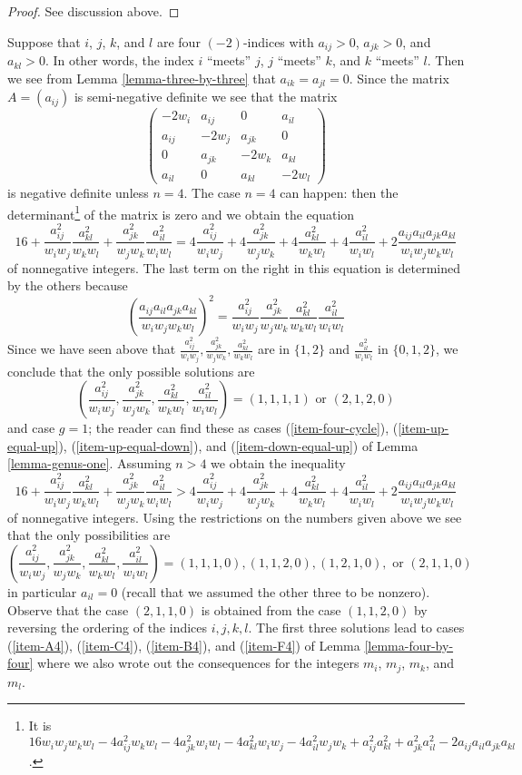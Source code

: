 \begin{proof}
See discussion above.
\end{proof}

\noindent
Suppose that $i$, $j$, $k$, and $l$ are four $(-2)$-indices with
$a_{ij} > 0$, $a_{jk} > 0$, and $a_{kl} > 0$. In other words, the
index $i$ ``meets'' $j$, $j$ ``meets'' $k$, and $k$ ``meets'' $l$.
Then we see from Lemma \ref{lemma-three-by-three} that $a_{ik} = a_{jl} = 0$.
Since the matrix $A = (a_{ij})$ is semi-negative definite we see that the
matrix
$$
\left(
\begin{matrix}
-2w_i & a_{ij} & 0 & a_{il} \\
a_{ij} & -2w_j & a_{jk} & 0 \\
0 & a_{jk} & -2w_k & a_{kl} \\
a_{il} & 0 & a_{kl} & -2w_l
\end{matrix}
\right)
$$
is negative definite unless $n = 4$. The case $n = 4$ can happen:
then the determinant\footnote{It is
$16w_iw_jw_kw_l - 4a_{ij}^2w_kw_l - 4a_{jk}^2w_iw_l - 4a_{kl}^2w_iw_j -
4a_{il}^2w_jw_k + a_{ij}^2a_{kl}^2 + a_{jk}^2a_{il}^2 -
2a_{ij}a_{il}a_{jk}a_{kl}$.} of the matrix is zero and we obtain the equation
$$
16 +
\frac{a_{ij}^2}{w_iw_j}\frac{a_{kl}^2}{w_kw_l} +
\frac{a_{jk}^2}{w_jw_k}\frac{a_{il}^2}{w_iw_l} =
4\frac{a_{ij}^2}{w_iw_j} + 4\frac{a_{jk}^2}{w_jw_k} + 4\frac{a_{kl}^2}{w_kw_l}
+ 4\frac{a_{il}^2}{w_iw_l} + 2\frac{a_{ij}a_{il}a_{jk}a_{kl}}{w_iw_jw_kw_l}
$$
of nonnegative integers. The last term on the right in this equation is
determined by the others because
$$
\left(\frac{a_{ij}a_{il}a_{jk}a_{kl}}{w_iw_jw_kw_l}\right)^2 =
\frac{a_{ij}^2}{w_iw_j} \frac{a_{jk}^2}{w_jw_k}
\frac{a_{kl}^2}{w_kw_l} \frac{a_{il}^2}{w_iw_l}
$$
Since we have seen above that
$\frac{a_{ij}^2}{w_iw_j}, \frac{a_{jk}^2}{w_jw_k}, \frac{a_{kl}^2}{w_kw_l}$
are in $\{1, 2\}$ and $\frac{a_{il}^2}{w_iw_l}$ in $\{0, 1, 2\}$,
we conclude that the only possible solutions are
$$
(\frac{a_{ij}^2}{w_iw_j}, \frac{a_{jk}^2}{w_jw_k}, \frac{a_{kl}^2}{w_kw_l},
\frac{a_{il}^2}{w_iw_l}) =
(1, 1, 1, 1) \text{ or } (2, 1, 2, 0)
$$
and case $g = 1$; the reader can find these as cases
(\ref{item-four-cycle}), (\ref{item-up-equal-up}),
(\ref{item-up-equal-down}), and (\ref{item-down-equal-up})
of Lemma \ref{lemma-genus-one}. Assuming $n > 4$
we obtain the inequality
$$
16 +
\frac{a_{ij}^2}{w_iw_j}\frac{a_{kl}^2}{w_kw_l} +
\frac{a_{jk}^2}{w_jw_k}\frac{a_{il}^2}{w_iw_l} >
4\frac{a_{ij}^2}{w_iw_j} + 4\frac{a_{jk}^2}{w_jw_k} + 4\frac{a_{kl}^2}{w_kw_l}
+ 4\frac{a_{il}^2}{w_iw_l} + 2\frac{a_{ij}a_{il}a_{jk}a_{kl}}{w_iw_jw_kw_l}
$$
of nonnegative integers. Using the restrictions on the numbers given above
we see that the only possibilities are
$$
(\frac{a_{ij}^2}{w_iw_j}, \frac{a_{jk}^2}{w_jw_k}, \frac{a_{kl}^2}{w_kw_l},
\frac{a_{il}^2}{w_iw_l}) =
(1, 1, 1, 0), (1, 1, 2, 0), (1, 2, 1, 0), \text{ or }(2, 1, 1, 0)
$$
in particular $a_{il} = 0$ (recall that we assumed the other three
to be nonzero). Observe that the case $(2, 1, 1, 0)$ is obtained
from the case $(1, 1, 2, 0)$ by reversing the ordering
of the indices $i, j, k, l$. The first three solutions lead
to cases (\ref{item-A4}), (\ref{item-C4}), (\ref{item-B4}), and
(\ref{item-F4}) of Lemma \ref{lemma-four-by-four}
where we also wrote out the consequences for the integers $m_i$, $m_j$, $m_k$,
and $m_l$.

